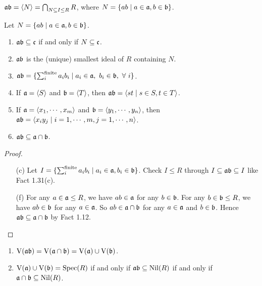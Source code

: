 \begin{definition}
    $\mathfrak{a} \mathfrak{b} = \langle N \rangle = \bigcap_{N \subseteq I \leq R}R$, where $N = \{ab \mid a \in \mathfrak{a},b \in \mathfrak{b}\}$. 
\end{definition}

\begin{fact}
    Let $N = \{ab \mid a \in \mathfrak{a},b \in \mathfrak{b}\}$.
    \begin{enumerate}
        \item $\mathfrak{a} \mathfrak{b} \subseteq \mathfrak{c}$ if and only if $N \subseteq \mathfrak{c}$.
        \item $\mathfrak{a} \mathfrak{b}$ is the (unique) smallest ideal of $R$ containing $N$.
        \item $\mathfrak{a}\mathfrak{b} = \{\sum_{i}^{\text{finite}}a_ib_i \mid a_i \in \mathfrak{a},\ b_i \in \mathfrak{b}, \ \forall \  i\}$.
        \item If $\mathfrak{a} = \langle S \rangle$ and $\mathfrak{b} = \langle T \rangle$, then $\mathfrak{a}\mathfrak{b} = \langle st \mid s \in S, t \in T\rangle$.
        \item If $\mathfrak{a} = \langle x_1,\cdots,x_m \rangle$ and $\mathfrak{b} = \langle y_1,\cdots,y_n \rangle$, then $\mathfrak{a}\mathfrak{b} = \langle x_iy_j \mid i = 1,\cdots,m,j = 1,\cdots,n \rangle$.
        \item $\mathfrak{a} \mathfrak{b} \subseteq \mathfrak{a} \cap \mathfrak{b}$.
    \end{enumerate}
\end{fact}

\begin{proof}
    \begin{enumerate}
        \item [(c)]
            Let $I = \{\sum_{i}^{\text{finite}} a_ib_i \mid a_i \in \mathfrak{a},b_i \in \mathfrak{b}\}$. Check $I \leq R$ through $I \subseteq \mathfrak{a} \mathfrak{b} \subseteq I$ like Fact 1.31(c).
        \item [(f)]
            For any $a \in \mathfrak{a} \leq R$, we have $ab \in \mathfrak{a}$ for any $b \in \mathfrak{b}$. For any $b \in \mathfrak{b} \leq R$, we have $ab \in \mathfrak{b}$ for any $a \in \mathfrak{a}$. So $ab \in \mathfrak{a} \cap \mathfrak{b}$ for any $a \in \mathfrak{a}$ and $b \in \mathfrak{b}$. Hence $\mathfrak{a} \mathfrak{b} \subseteq \mathfrak{a} \cap \mathfrak{b}$ by Fact 1.12. \qedhere
    \end{enumerate}
\end{proof}

\begin{proposition}
    \begin{enumerate}
        \item 
            $\operatorname{V}(\mathfrak{a} \mathfrak{b}) = \operatorname{V}(\mathfrak{a} \cap \mathfrak{b}) = \operatorname{V}(\mathfrak{a}) \cup \operatorname{V}(\mathfrak{b})$.
        \item 
            $\operatorname{V}(\mathfrak{a}) \cup \operatorname{V}(\mathfrak{b}) = \operatorname{Spec}(R)$ if and only if $\mathfrak{a} \mathfrak{b} \subseteq \operatorname{Nil}(R)$ if and only if $\mathfrak{a} \cap \mathfrak{b} \subseteq \operatorname{Nil}(R)$.
    \end{enumerate}
\end{proposition}

